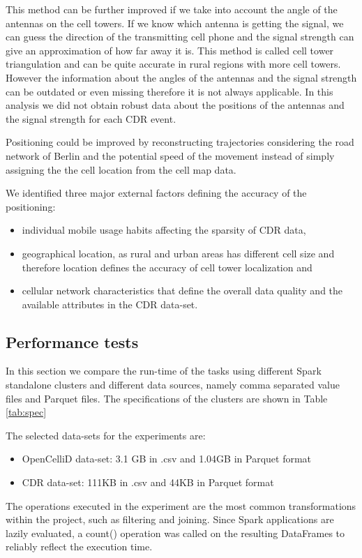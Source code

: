 This method can be further improved if we take into account the angle of the antennas on the cell towers. If we know which antenna is getting the signal, we can guess the direction of the transmitting cell phone and the signal strength can give an approximation of how far away it is. This method is called cell tower triangulation and can be quite accurate in rural regions with more cell towers. However the information about the angles of the antennas and the signal strength can be outdated or even missing therefore it is not always applicable. In this analysis we did not obtain robust data about the positions of the antennas and the signal strength for each CDR event.

Positioning could be improved by reconstructing trajectories considering the road network of Berlin and the potential speed of the movement instead of simply assigning the the cell location from the cell map data.

We identified three major external factors defining the accuracy of the positioning:
\begin{itemize}
    \item individual mobile usage habits affecting the sparsity of CDR data,
    \item geographical location, as rural and urban areas has different cell size and therefore location defines the accuracy of cell tower localization and
    \item cellular network characteristics that define the overall data quality and the available attributes in the CDR data-set.
\end{itemize}


\subsection{Performance tests}
In this section we compare the run-time of the tasks using different Spark standalone clusters and different data sources, namely comma separated value files and Parquet files. The specifications of the clusters are shown in Table \ref{tab:spec}

The selected data-sets for the experiments are:
\begin{itemize}
    \item OpenCelliD data-set: 3.1 GB in .csv  and 1.04GB in Parquet format
    \item CDR data-set: 111KB in .csv and 44KB in Parquet format
\end{itemize}

The operations executed in the experiment are the most common transformations within the project, such as filtering and joining. Since Spark applications are lazily evaluated, a count() operation was called on the resulting DataFrames to reliably reflect the execution time.

